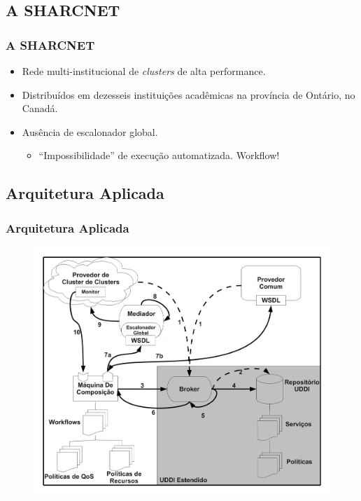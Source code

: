 \documentclass[red, cover=invisible, theme=Warsaw]{myslides}
\begin{document}
    \subsection{A SHARCNET}
	\begin{frame} \frametitle{A SHARCNET}
	    \begin{itemize}
		\item Rede multi-institucional de \textit{clusters} de alta performance.
		\item Distribuídos em dezesseis instituições acadêmicas na província de Ontário, no Canadá.
		\item Ausência de escalonador global.
		    \begin{itemize}
			\item ``Impossibilidade'' de execução automatizada. Workflow!
		    \end{itemize}
	    \end{itemize}
	\end{frame}
    
    \subsection{Arquitetura Aplicada}    
	\begin{frame} \frametitle{Arquitetura Aplicada}
	    \begin{center}
		\begin{figure}
		\includegraphics[scale=0.25]{imagens/execComposicaoA.pdf}	    
		\end{figure}
	    \end{center}
	\end{frame}
	
\end{document}
